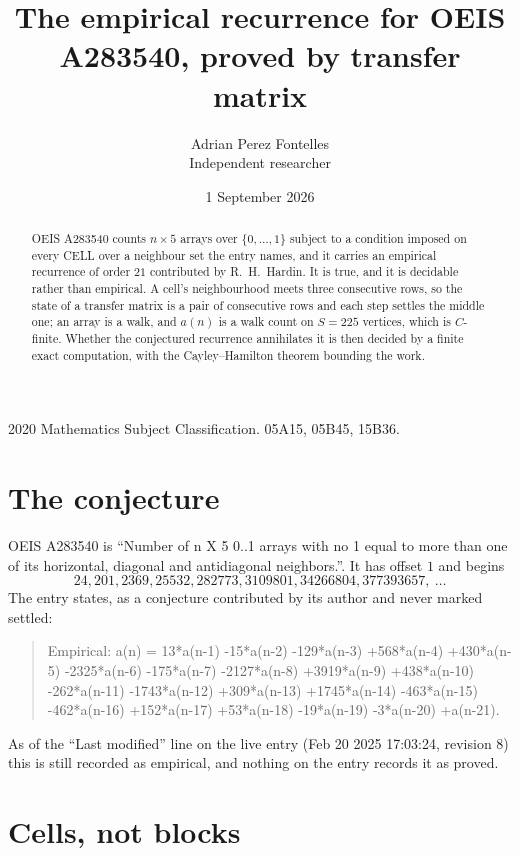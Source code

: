 \documentclass[11pt,a4paper]{article}
\title{The empirical recurrence for OEIS A283540, proved by transfer matrix}
\author{Adrian Perez Fontelles\\ \small Independent researcher}
\date{1 September 2026}
\theoremstyle{plain}
\theoremstyle{definition}
\begin{document}
\maketitle

\begin{abstract}
OEIS A283540 counts $n\times5$ arrays over $\{0,\dots,1\}$ subject to a condition imposed on
every CELL over a neighbour set the entry names, and it carries an empirical recurrence of
order $21$ contributed by R.~H.~Hardin. It is true, and it is decidable rather than
empirical. A cell's neighbourhood meets three consecutive rows, so the state of a transfer
matrix is a pair of consecutive rows and each step settles the middle one; an array is a
walk, and $a(n)$ is a walk count on $S=225$ vertices, which is $C$-finite. Whether the
conjectured recurrence annihilates it is then decided by a finite exact computation, with the
Cayley--Hamilton theorem bounding the work.
\end{abstract}

\noindent\small 2020 Mathematics Subject Classification. 05A15, 05B45, 15B36.\normalsize

\section{The conjecture}

OEIS A283540 is ``Number of n X 5 0..1 arrays with no 1 equal to more than one of its horizontal, diagonal and antidiagonal neighbors.''. It has offset $1$ and begins
\[
24, 201, 2369, 25532, 282773, 3109801, 34266804, 377393657,\ \dots
\]
The entry states, as a conjecture contributed by its author and never marked settled:
\begin{quote}
Empirical: a(n) = 13*a(n-1) -15*a(n-2) -129*a(n-3) +568*a(n-4) +430*a(n-5) -2325*a(n-6) -175*a(n-7) -2127*a(n-8) +3919*a(n-9) +438*a(n-10) -262*a(n-11) -1743*a(n-12) +309*a(n-13) +1745*a(n-14) -463*a(n-15) -462*a(n-16) +152*a(n-17) +53*a(n-18) -19*a(n-19) -3*a(n-20) +a(n-21).
\end{quote}
As of the ``Last modified'' line on the live entry (Feb 20 2025 17:03:24, revision 8) this is still
recorded as empirical, and nothing on the entry records it as proved.

\section{Cells, not blocks}
\end{document}
